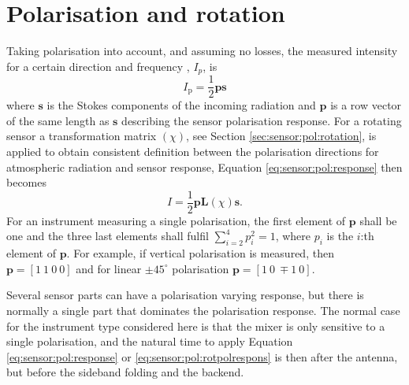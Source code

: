 \section{Polarisation and rotation}
\label{sec:sensor:pol}
Taking polarisation into account, and assuming no losses, the measured
intensity for a certain direction and frequency , $I_p$, is
\begin{equation}
\label{eq:sensor:pol:response}
  I_\mathrm{p} = \frac{1}{2} \mathbf{p} \mathbf{s}
\end{equation}
where $\mathbf{s}$ is the Stokes components of the incoming radiation
and $\mathbf{p}$ is a row vector of the same length as $\mathbf{s}$
describing the sensor polarisation response. For a rotating sensor a
transformation matrix $(\chi)$, see
Section \ref{sec:sensor:pol:rotation}, is applied to obtain consistent
definition between the polarisation directions for atmospheric
radiation and sensor response, Equation \ref{eq:sensor:pol:response}
then becomes
\begin{equation}
\label{eq:sensor:pol:rotpolrespons}
  I = \frac{1}{2} \mathbf{p} \mathbf{L}(\chi) \mathbf{s}.
\end{equation}
For an instrument measuring a single polarisation, the first element
of $\mathbf{p}$ shall be one and the three last elements shall fulfil
$\sum_{i=2}^4 p_i^2 = 1$, where $p_i$ is the $i$:th element of
$\mathbf{p}$. For example, if vertical polarisation is measured, then
$\mathbf{p}=[1\ 1\ 0\ 0]$ and for linear $\pm45^\circ$ polarisation
$\mathbf{p}=[1\ 0\ \mp\!\!1\ 0]$.

Several sensor parts can have a polarisation varying response, but
there is normally a single part that dominates the polarisation
response. The normal case for the instrument type considered here is
that the mixer is only sensitive to a single polarisation, and the
natural time to apply Equation \ref{eq:sensor:pol:response} or
\ref{eq:sensor:pol:rotpolrespons} is then after the antenna, but
before the sideband folding and the backend.

